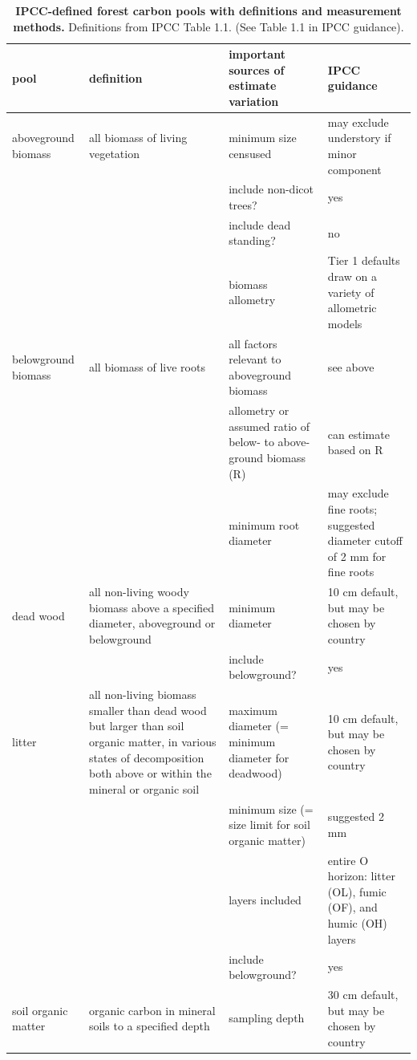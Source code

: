 \documentclass[, manuscript]{copernicus}
\begin{document}
\begin{table}
\caption{\label{tab:table_pools}\textbf{IPCC-defined forest carbon pools with definitions and measurement methods.} Definitions from IPCC Table 1.1. (See Table 1.1 in IPCC guidance).}
\centering
\begin{tabu} to 
\hline
\textbf{pool} & \textbf{definition} & \textbf{important sources of estimate variation} & \textbf{IPCC guidance}\\
\hline
aboveground biomass & all biomass of living vegetation & minimum size censused & may exclude understory if minor component\\
\hline
 &  & include non-dicot trees? & yes\\
\hline
 &  & include dead standing? & no\\
\hline
 &  & biomass allometry & Tier 1 defaults draw on a variety of allometric models\\
\hline
belowground biomass & all biomass of live roots & all factors relevant to aboveground biomass & see above\\
\hline
 &  & allometry or assumed ratio of below- to above-ground biomass (R) & can estimate based on R\\
\hline
 &  & minimum root diameter & may exclude fine roots; suggested diameter cutoff of 2 mm for fine roots\\
\hline
dead wood & all non-living woody biomass above a specified diameter, aboveground or belowground & minimum diameter & 10 cm default, but may be chosen by country\\
\hline
 &  & include belowground? & \vphantom{1} yes\\
\hline
litter & all non-living biomass smaller than dead wood but larger than soil organic matter, in various states of decomposition both above or within the mineral or organic soil & maximum diameter (= minimum diameter for deadwood) & 10 cm default, but may be chosen by country\\
\hline
 &  & minimum size (= size limit for soil organic matter) & suggested 2 mm\\
\hline
 &  & layers included & entire O horizon: litter (OL),  fumic (OF),  and  humic (OH) layers\\
\hline
 &  & include belowground? & yes\\
\hline
soil organic matter & organic carbon in mineral soils to a specified depth & sampling depth & 30 cm default, but may be chosen by country\\
\hline
\end{tabu}
\end{table}
\end{document}
